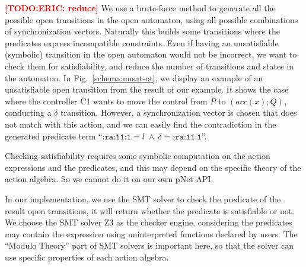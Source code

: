 \documentclass{lncs/llncs}
\newcommand{\TODO}[1]{\textcolor{red}{\textbf{[TODO:#1]}}}
\newcommand{\OTvar}{\texttt}
\newcommand{\OTland}{\;\land\ }
\newcommand{\QIN}[1]{\textcolor{airforceblue}{#1}}
\begin{document}
\TODO{ERIC: reduce}
We use a brute-force method to generate all the possible open
transitions in the open automaton, using all possible combinations of
synchronization vectors. Naturally this builds some transitions where
the predicates express incompatible constraints. Even if having an
unsatisfiable (symbolic) transition in the open automaton would not be incorrect,
we want to check them for satisfiability, and reduce the number of
transitions and states in the automaton.
In Fig.~\ref{schema:unsat-ot}, we display an example of an
unsatisfiable open transition 
from the result of our example. It shows the case where
the controller C1 wants to move the control from $P$ to $(acc(x);Q)$,
conducting a $\delta$ transition. However, a synchronization
vector is chosen that does not match with this action, and we can
easily find the contradiction in the 
generated predicate term ``$\OTvar{:ra:11:1}=l \!\OTland\! \delta=\OTvar{:ra:11:1}$''. 

Checking satisfiability requires some symbolic computation
on the action expressions and the predicates, and this 
may depend on the specific theory of the action algebra. 
\QIN{
So we cannot do it on our own pNet API.
}

\QIN{
In our implementation, we use the SMT solver to check the predicate of the result open transitions, 
it will return whether the predicate is satisfiable or not.
}
We choose the SMT solver Z3 as the checker engine, considering
the predicates may contain the expression 
using uninterpreted functions declared by users.
The ``Modulo Theory'' part of SMT solvers is important here, so that
the solver can use specific properties of each action algebra.
\end{document}
